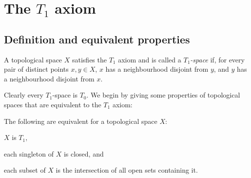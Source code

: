 \documentclass[article, a4paper, 11pt, oneside]{memoir}
\numberwithin{equation}{chapter}
\begin{document}



\chapter[The T1 axiom][The $T_1$ axiom]{The $T_1$ axiom}

\section{Definition and equivalent properties}

\begin{definition}
    A topological space $X$ satisfies the $T_1$ axiom and is called a \emph{$T_1$-space} if, for every pair of distinct points $x,y \in X$, $x$ has a neighbourhood disjoint from $y$, and $y$ has a neighbourhood disjoint from $x$.
\end{definition}
%
Clearly every $T_1$-space is $T_0$. We begin by giving some properties of topological spaces that are equivalent to the $T_1$ axiom:

\begin{proposition}
    The following are equivalent for a topological space $X$:
    \begin{enumprop}
        \item \label{enum:T1-space} $X$ is $T_1$,
        \item \label{enum:T1-singletons-closed} each singleton of $X$ is closed, and
        \item \label{enum:T1-intersection-of-open-sets} each subset of $X$ is the intersection of all open sets containing it.
    \end{enumprop}
\end{proposition}
\end{document}
